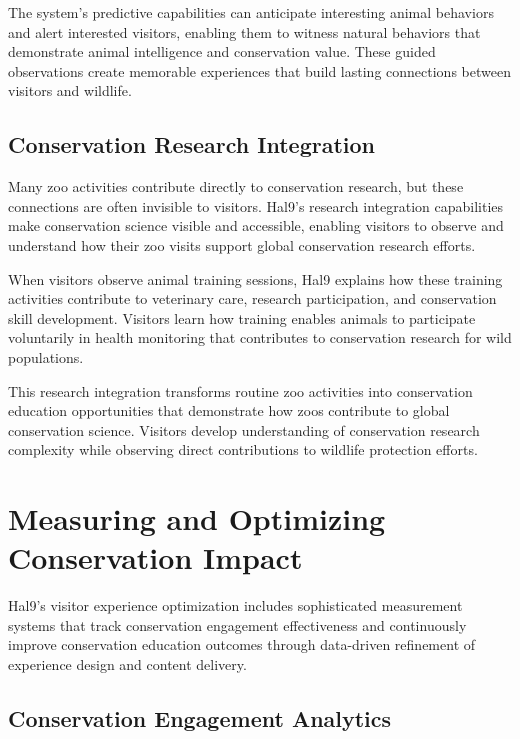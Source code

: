 \documentclass[
  Letterpaper,
]{scrbook}
\begin{document}
The system's predictive capabilities can anticipate interesting animal
behaviors and alert interested visitors, enabling them to witness
natural behaviors that demonstrate animal intelligence and conservation
value. These guided observations create memorable experiences that build
lasting connections between visitors and wildlife.

\subsection{Conservation Research
Integration}\label{conservation-research-integration}

Many zoo activities contribute directly to conservation research, but
these connections are often invisible to visitors. Hal9's research
integration capabilities make conservation science visible and
accessible, enabling visitors to observe and understand how their zoo
visits support global conservation research efforts.

When visitors observe animal training sessions, Hal9 explains how these
training activities contribute to veterinary care, research
participation, and conservation skill development. Visitors learn how
training enables animals to participate voluntarily in health monitoring
that contributes to conservation research for wild populations.

This research integration transforms routine zoo activities into
conservation education opportunities that demonstrate how zoos
contribute to global conservation science. Visitors develop
understanding of conservation research complexity while observing direct
contributions to wildlife protection efforts.

\section{Measuring and Optimizing Conservation
Impact}\label{measuring-and-optimizing-conservation-impact}

Hal9's visitor experience optimization includes sophisticated
measurement systems that track conservation engagement effectiveness and
continuously improve conservation education outcomes through data-driven
refinement of experience design and content delivery.

\subsection{Conservation Engagement
Analytics}\label{conservation-engagement-analytics}
\end{document}
